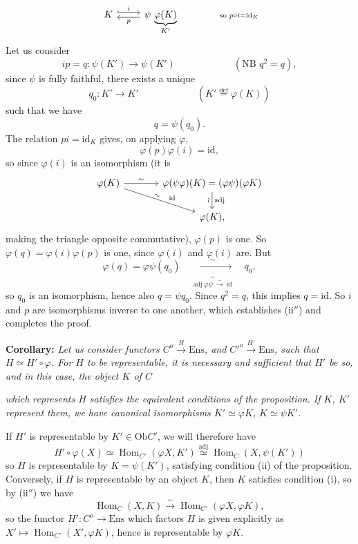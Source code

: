 \documentclass[11pt]{article}
\newcommand{\printedpage}[1]{\marginpar{\footnotesize p.~#1}}
\newcommand{\msp}[1]{\marginpar{\footnotesize [#1]}}
\newcommand{\Hom}{\operatorname{Hom}}
\newcommand{\Ens}{\mathrm{Ens}}
\newcommand{\Ob}{\mathrm{Ob}}
\newcommand{\id}{\mathrm{id}}
\begin{document}
\[
\begin{tikzcd}
K \arrow[r,hook,shift left,"i"] & \psi\,\underbrace{\varphi(K)}_{K'} \arrow[l,shift left,"p"]
\end{tikzcd}
\qquad\qquad {\scriptstyle \text{so } p\circ i = \id_K}
\]
Let us consider
\[
ip = q : \psi(K') \longrightarrow \psi(K') \qquad\qquad\qquad (\text{NB } q^2 = q),
\]
since $\psi$ is fully faithful, there exists a unique
\[
q_0 : K' \longrightarrow K' \qquad\qquad\qquad (K' \overset{\text{def}}{=} \varphi(K))
\]
such that we have
\[
q = \psi(q_0).
\]
The relation $pi = \id_K$ gives, on applying $\varphi$,
\[
\varphi(p)\varphi(i) = \id,
\]
so since $\varphi(i)$ is an isomorphism (it is
\[
\begin{tikzcd}[column sep=large]
\varphi(K) \arrow[r,"\sim"] \arrow[dr,"\sim"{sloped,pos=0.45},"\id"{pos=0.6}] & \varphi(\psi\varphi)(K) = (\varphi\psi)(\varphi K) \arrow[d,"\wr"',"\mathrm{adj}"] \\
 & \varphi(K),
\end{tikzcd}
\]
making the triangle opposite commutative), $\varphi(p)$ is one. So $\varphi(q) = \varphi(i)\varphi(p)$ is one, since $\varphi(i)$ and $\varphi(i)$ are. But
\[
\varphi(q) = \varphi\psi(q_0) \quad \underbrace{\xrightarrow{\ \sim\ }}_{\mathrm{adj}\ \varphi\psi\ \xrightarrow{\sim}\ \id} \quad q_0,
\]
so $q_0$ is an isomorphism, hence also $q = \psi q_0$. Since $q^2 = q$, this implies $q = \id$. So $i$ and $p$ are isomorphisms inverse to one another, which establishes (ii$''$) and completes the proof.

\textbf{Corollary:} \textit{Let us consider functors $C^o \xrightarrow{H} \Ens$, and $C'^o \xrightarrow{H'} \Ens$, such that $H \simeq H'\circ\varphi$. For $H$ to be representable, it is necessary and sufficient that $H'$ be so, and in this case, the object $K$ of $C$}

\noindent\msp{page 40}%
\textit{which represents $H$ satisfies the equivalent conditions of the proposition. If $K$, $K'$ represent them, we have canonical isomorphisms $K' \simeq \varphi K$, $K \simeq \psi K'$.}

If $H'$ is representable by $K' \in \Ob C'$, we will therefore have
\[
H'\circ\varphi(X) \simeq \Hom_{C'}(\varphi X,K') \overset{\mathrm{adj}}{\simeq} \Hom_C(X,\psi(K'))
\]
\printedpage{26}
so $H$ is representable by $K = \psi(K')$, satisfying condition (ii) of the proposition. Conversely, if $H$ is representable by an object $K$, then $K$ satisfies condition (i), so by (ii$''$) we have
\[
\Hom_C(X,K) \xrightarrow{\sim} \Hom_{C'}(\varphi X,\varphi K),
\]
so the functor $H' : C^o \longrightarrow \Ens$ which factors $H$ is given explicitly as $X' \longmapsto \Hom_{C'}(X',\varphi K)$, hence is representable by $\varphi K$. %
\end{document}
